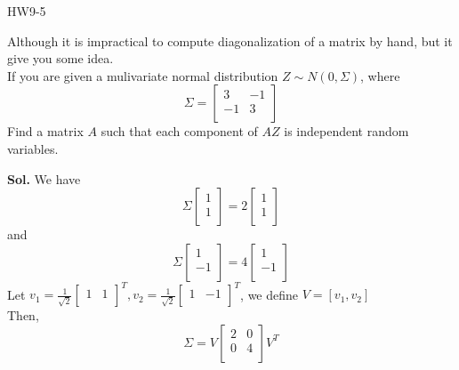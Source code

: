 \begin{exercise}
    HW9-5 
\end{exercise}
\begin{eg}[diagonalization]
    Although it is impractical to compute diagonalization of a matrix by hand, but it give you some idea. 
    \\If you are given a mulivariate normal distribution \(Z \sim N(0, \Sigma )\), where 
    \[
        \Sigma  = \begin{bmatrix}
            3 &  -1 \\
            -1 &  3 \\
        \end{bmatrix}
    \]
    Find a matrix \(A\) such that each component of \(AZ\) is independent random variables.   
\end{eg}
\textbf{Sol.}
We have 
    \[
        \Sigma \begin{bmatrix}
             1 \\
             1 \\
        \end{bmatrix} = 2 \begin{bmatrix}
             1 \\
             1 \\
        \end{bmatrix}
    \]
    and 
    \[
        \Sigma \begin{bmatrix}
             1 \\
             -1 \\
        \end{bmatrix} = 4 \begin{bmatrix}
             1 \\
             -1 \\
        \end{bmatrix}
    \]
    Let \(v_1 = \frac{1}{\sqrt{2} }\begin{bmatrix}
        1 &  1 \\
    \end{bmatrix}^T, v_2 = \frac{1}{\sqrt{2} } \begin{bmatrix}
        1 &  -1 \\
    \end{bmatrix}^{T} \), we define \(V = [v_1, v_2]\)
    \\
    Then,
    \[
        \Sigma = V \begin{bmatrix}
            2 &  0 \\
            0 &  4 \\
        \end{bmatrix} V^T 
    \] 
